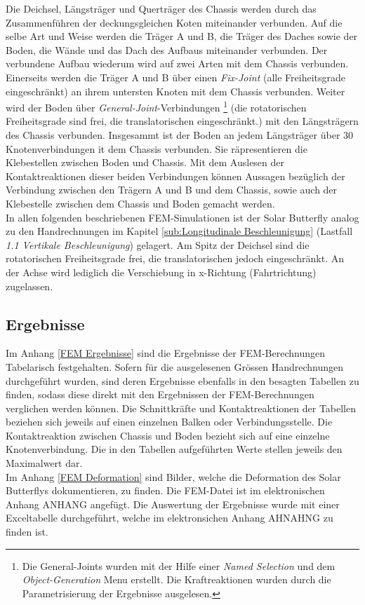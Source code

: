 Die Deichsel, Längsträger und Querträger des Chassis werden durch das Zusammenführen der deckungsgleichen Koten miteinander verbunden. Auf die selbe Art und Weise werden die Träger A und B, die Träger des Daches sowie der Boden, die Wände und das Dach des Aufbaus miteinander verbunden. Der verbundene Aufbau wiederum wird auf zwei Arten mit dem Chassis verbunden. Einerseits werden die Träger A und B über einen \emph{Fix-Joint} (alle Freiheitsgrade eingeschränkt) an ihrem untersten Knoten mit dem Chassis verbunden. Weiter wird der Boden über \emph{General-Joint}-Verbindungen
\footnote{Die General-Joints wurden mit der Hilfe einer \emph{Named Selection} und dem \emph{Object-Generation} Menu erstellt. Die Kraftreaktionen wurden durch die Parametrisierung der Ergebnisse ausgelesen.}
(die rotatorischen Freiheitsgrade sind frei, die translatorischen eingeschränkt.) mit den Längsträgern des Chassis verbunden. Insgesammt ist der Boden an jedem Längsträger über 30 Knotenverbindungen it dem Chassis verbunden. Sie räpresentieren die Klebestellen zwischen Boden und Chassis. Mit dem Auslesen der Kontaktreaktionen dieser beiden Verbindungen können Aussagen bezüglich der Verbindung zwischen den Trägern A und B und dem Chassis, sowie auch der Klebestelle zwischen dem Chassis und Boden gemacht werden.\\
In allen folgenden beschriebenen FEM-Simulationen ist der Solar Butterfly analog zu den Handrechnungen im Kapitel \ref{sub:Longitudinale Beschleunigung} (Lastfall \emph{1.1 Vertikale Beschleunigung}) gelagert. Am Spitz der Deichsel sind die rotatorischen Freiheitsgrade frei, die translatorischen jedoch eingeschränkt. An der Achse wird lediglich die Verschiebung in x-Richtung (Fahrtrichtung) zugelassen.

\subsection{Ergebnisse}
Im Anhang \ref{FEM Ergebnisse} sind die Ergebnisse der FEM-Berechnungen Tabelarisch festgehalten. Sofern für die ausgelesenen Grössen Handrechnungen durchgeführt wurden, sind deren Ergebnisse ebenfalls in den besagten Tabellen zu finden, sodass diese direkt mit den Ergebnissen der FEM-Berechnungen verglichen werden können. Die Schnittkräfte und Kontaktreaktionen der Tabellen beziehen sich jeweils auf einen einzelnen Balken oder Verbindungsstelle. Die Kontaktreaktion zwischen Chassis und Boden bezieht sich auf eine einzelne Knotenverbindung. Die in den Tabellen aufgeführten Werte stellen jeweils den Maximalwert dar.\\
Im Anhang \ref{FEM Deformation} sind Bilder, welche die Deformation des Solar Butterflys dokumentieren, zu finden. Die FEM-Datei ist im elektronischen Anhang ANHANG angefügt. Die Auswertung der Ergebnisse wurde mit einer Exceltabelle durchgeführt, welche im elektronsichen Anhang AHNAHNG zu finden ist.


